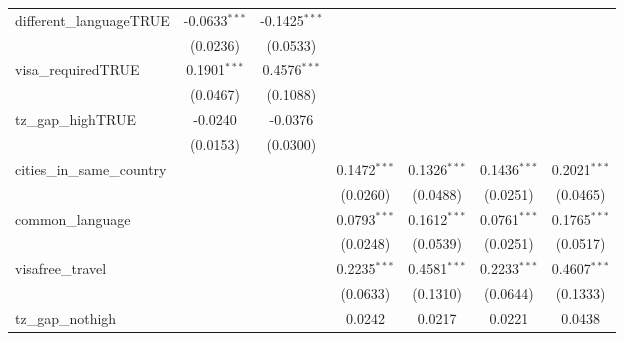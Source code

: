 \begin{tabular}{lcccccc}
   different\_languageTRUE                                & -0.0633$^{***}$ & -0.1425$^{***}$     &                &                     &                 &   \\   
                                                          & (0.0236)        & (0.0533)            &                &                     &                 &   \\   
   visa\_requiredTRUE                                     & 0.1901$^{***}$  & 0.4576$^{***}$      &                &                     &                 &   \\   
                                                          & (0.0467)        & (0.1088)            &                &                     &                 &   \\   
   tz\_gap\_highTRUE                                      & -0.0240         & -0.0376             &                &                     &                 &   \\   
                                                          & (0.0153)        & (0.0300)            &                &                     &                 &   \\   
   cities\_in\_same\_country                              &                 &                     & 0.1472$^{***}$ & 0.1326$^{***}$      & 0.1436$^{***}$  & 0.2021$^{***}$\\   
                                                          &                 &                     & (0.0260)       & (0.0488)            & (0.0251)        & (0.0465)\\   
   common\_language                                       &                 &                     & 0.0793$^{***}$ & 0.1612$^{***}$      & 0.0761$^{***}$  & 0.1765$^{***}$\\   
                                                          &                 &                     & (0.0248)       & (0.0539)            & (0.0251)        & (0.0517)\\   
   visafree\_travel                                       &                 &                     & 0.2235$^{***}$ & 0.4581$^{***}$      & 0.2233$^{***}$  & 0.4607$^{***}$\\   
                                                          &                 &                     & (0.0633)       & (0.1310)            & (0.0644)        & (0.1333)\\   
   tz\_gap\_nothigh                                       &                 &                     & 0.0242         & 0.0217              & 0.0221          & 0.0438\\   

\end{tabular}
